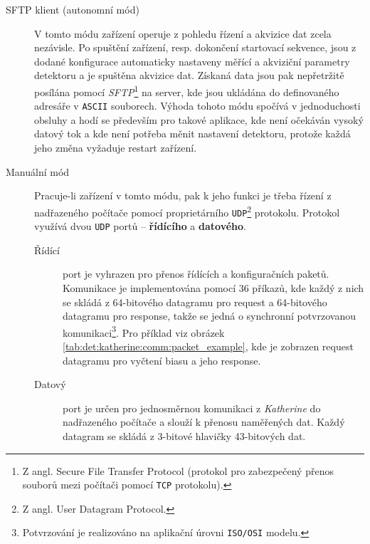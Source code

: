 \begin{description}
	\item [SFTP klient (autonomní mód)] V tomto módu zařízení operuje z pohledu řízení a akvizice dat zcela nezávisle. Po spuštění zařízení, resp. dokončení startovací sekvence, jsou z dodané konfigurace automaticky nastaveny měřící a akviziční parametry detektoru a je spuštěna akvizice dat. Získaná data jsou pak nepřetržitě posílána pomocí \textit{SFTP}\footnote{Z angl. Secure File Transfer Protocol (protokol pro zabezpečený přenos souborů mezi počítači pomocí \texttt{TCP} protokolu).} na server, kde jsou ukládána do definovaného adresáře v \texttt{ASCII} souborech. Výhoda tohoto módu spočívá v jednoduchosti obsluhy a hodí se především pro takové aplikace, kde není očekáván vysoký datový tok a kde není potřeba měnit nastavení detektoru, protože každá jeho změna vyžaduje restart zařízení.
	
	\item [Manuální mód] Pracuje-li zařízení v tomto módu, pak k jeho funkci je třeba řízení z nadřazeného počítače pomocí proprietárního \texttt{UDP}\footnote{Z angl. User Datagram Protocol.} protokolu. Protokol využívá dvou \texttt{UDP} portů -- \textbf{řídícího} a \textbf{datového}.

	\begin{description}
		\item [Řídící] port je vyhrazen pro přenos řídících a konfiguračních paketů. Komunikace je implementována pomocí $36$ příkazů, kde každý z nich se skládá z 64-bitového datagramu pro request a 64-bitového datagramu pro response, takže se jedná o synchronní potvrzovanou komunikaci\footnote{Potvrzování je realizováno na aplikační úrovni \texttt{ISO/OSI} modelu.}. Pro příklad viz obrázek \ref{tab:det:katherine:comm:packet_example}, kde je zobrazen request datagramu pro vyčtení biasu a jeho response.
		
		\item [Datový] port je určen pro jednosměrnou komunikaci z \textit{Katherine} do nadřazeného počítače a slouží k přenosu naměřených dat. Každý datagram se skládá z 3-bitové hlavičky 43-bitových dat.
	\end{description}
	
\end{description}

